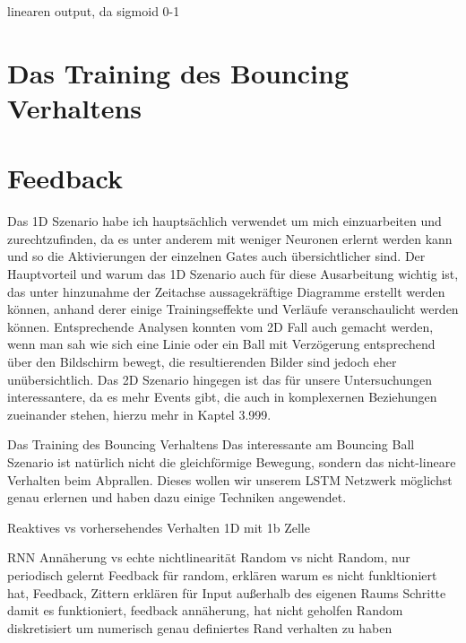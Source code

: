 linearen output, da sigmoid 0-1


\section{Das Training des Bouncing Verhaltens}




\section{Feedback}

Das 1D Szenario habe ich hauptsächlich verwendet um mich einzuarbeiten und zurechtzufinden, da es unter anderem mit weniger Neuronen erlernt werden kann und so die Aktivierungen der einzelnen Gates auch übersichtlicher sind. Der Hauptvorteil und warum das 1D Szenario auch für diese Ausarbeitung wichtig ist, das unter hinzunahme der Zeitachse aussagekräftige Diagramme erstellt werden können, anhand derer einige Trainingseffekte und Verläufe veranschaulicht werden können. Entsprechende Analysen konnten vom 2D Fall auch gemacht werden, wenn man sah wie sich eine Linie  oder ein Ball mit Verzögerung entsprechend über den Bildschirm bewegt, die resultierenden Bilder sind jedoch eher unübersichtlich. Das 2D Szenario hingegen ist das für unsere Untersuchungen interessantere, da es mehr Events gibt, die auch in komplexernen Beziehungen zueinander stehen, hierzu mehr in Kaptel 3.999.

Das Training des Bouncing Verhaltens
Das interessante am Bouncing Ball Szenario ist natürlich nicht die gleichförmige Bewegung, sondern das nicht-lineare Verhalten beim Abprallen. Dieses wollen wir unserem LSTM Netzwerk möglichst genau erlernen und haben dazu einige Techniken angewendet. 

Reaktives vs vorhersehendes Verhalten
1D mit 1b Zelle

RNN Annäherung vs echte nichtlinearität
Random vs nicht Random, nur periodisch gelernt
Feedback für random, erklären warum es nicht funkltioniert hat,
Feedback, Zittern erklären für Input außerhalb des eigenen Raums
Schritte damit es funktioniert, feedback annäherung, hat nicht geholfen
Random diskretisiert um numerisch genau definiertes Rand verhalten zu haben